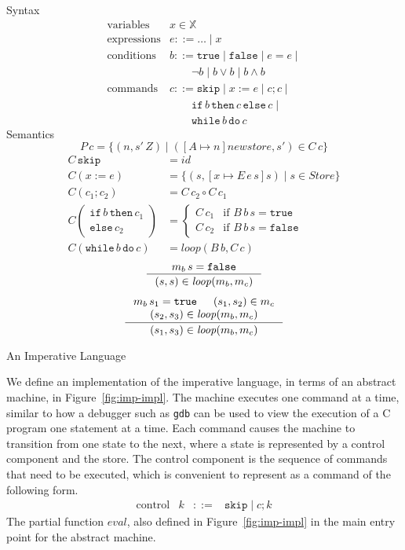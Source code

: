 \documentclass{tufte-handout}
\newcommand{\ASSIGN}[2]{#1 \mathrel{:=} #2}
\newcommand{\SEQ}[2]{#1 \mathrel{;} #2}
\newcommand{\SKIP}[0]{\mathtt{skip}}
\newcommand{\IF}[3]{\mathtt{if}\,#1\,\mathtt{then}\,#2\,\mathtt{else}\,#3}
\newcommand{\WHILE}[2]{\mathtt{while}\,#1\,\mathtt{do}\,#2}
\newcommand{\TRUE}[0]{\mathtt{true}}
\newcommand{\FALSE}[0]{\mathtt{false}}
\begin{document}
\begin{marginfigure}
\noindent Syntax
\[
\begin{array}{ll}
  \text{variables} & x \in \mathbb{X}  \\
 \text{expressions} & e ::= \ldots \mid x \\
 \text{conditions} & b  ::= \TRUE \mid \FALSE \mid e = e \mid \\
  &   \qquad \neg b \mid b \lor b \mid b \land b \\
 \text{commands}& c ::= \SKIP \mid \ASSIGN{x}{e} \mid \SEQ{c}{c} \mid\\
  &      \qquad \IF{b}{c}{c} \mid \\
  &      \qquad \WHILE{b}{c} 
\end{array}
\]
Semantics 
\[
P\,c = \{ (n,s'\,Z) \mid ([A{\mapsto} n]\mathit{newstore},s') \in C\,c \}
\]
\begin{align*}
C\,\SKIP &= \mathit{id} \\ %
C(\ASSIGN{x}{e}) &= \{ (s,[x\mapsto E\,e\,s]s) \mid s {\in} \mathit{Store} \}\\
C(\SEQ{c_1}{c_2}) &=  C\,c_2 \circ C\,c_1 \\
C\left(\!\!\begin{array}{l}
  \mathtt{if}\,b\,\mathtt{then}\,c_1\\
  \mathtt{else}\,c_2
  \end{array}\!\!\right)
  &= 
 \begin{cases}
  C\,c_1 & \text{if } B\,b\,s = \TRUE \\
  C\,c_2 & \text{if } B\,b\,s = \FALSE
 \end{cases} \\
C(\WHILE{b}{c}) &= \mathit{loop}(B\,b, C\,c)
\end{align*}
\begin{gather*}
  \inference{m_b\,s = \FALSE}
            {(s,s) \in \mathit{loop}(m_b, m_c)}
\\[1ex]
  \inference{m_b\,s_1 = \TRUE & 
             (s_1,s_2) \in m_c \\
             (s_2, s_3) \in \mathit{loop}(m_b, m_c)}
            {(s_1, s_3) \in \mathit{loop}(m_b, m_c)}
\end{gather*}
\caption{An Imperative Language}
\label{fig:imperative}
\end{marginfigure}


We define an implementation of the imperative language, in terms of an
abstract machine, in Figure~\ref{fig:imp-impl}. The machine executes
one command at a time, similar to how a debugger such as \texttt{gdb}
can be used to view the execution of a C program one statement at a
time. Each command causes the machine to transition from one state to
the next, where a state is represented by a control component and the
store. The control component is the sequence of commands that need to
be executed, which is convenient to represent as a command of the
following form.
\[
\begin{array}{lrcl}
  \text{control} & k & ::= & \SKIP \mid \SEQ{c}{k}
\end{array}
\]
The partial function $\mathit{eval}$, also defined in
Figure~\ref{fig:imp-impl} in the main entry point for the abstract
machine.
\end{document}
